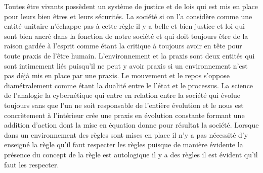 \documentclass[12pt,a4paper]{article}
\begin{document}
Toutes être vivants possèdent un système de justice et de lois qui est mis en place pour leurs bien êtres et leurs sécurités. La société si on l’a considère comme une entité unitaire n’échappe pas à cette règle il y a belle et bien justice et loi qui sont bien ancré dans la fonction de notre société et qui doit toujours être de la raison gardée à l’esprit comme étant la critique à toujours avoir en tête pour toute praxis de l’être humain. L’environnement et la praxis sont deux entités qui sont intimement liés puisqu’il ne peut y avoir praxis si un environnement n’est pas déjà mis en place par une praxis. Le mouvement et le repos s’oppose diamétralement comme étant la dualité entre le l’état et le processus. La science de l’analogie la cybernétique qui entre en relation entre la société qui évolue toujours sans que l’un ne soit responsable de l’entière évolution et le nous est concrètement à l’intérieur crée une praxis en évolution constante formant une addition d’action dont la mise en équation donne pour résultat la société. Lorsque dans un environnement des règles sont mises en place il n’y a pas nécessité d’y enseigné la règle qu’il faut respecter les règles puisque de manière évidente la présence du concept de la règle est autologique il y a des règles il est évident qu’il faut les respecter.
\end{document}
